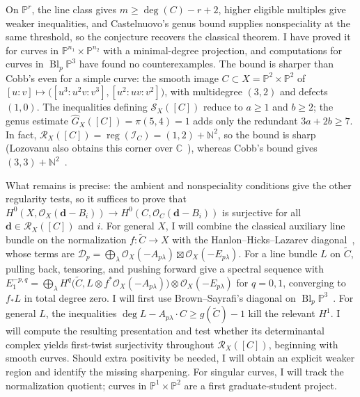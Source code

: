 \documentclass[11pt,reqno]{amsart}
\theoremstyle{remark}
\newcommand{\reg}{\operatorname{reg}}
\newcommand{\Bl}{\operatorname{Bl}}
\newcommand{\dd}{\mathbf{d}}
\newcommand{\CC}{\mathbb{C}}
\newcommand{\NN}{\mathbb{N}}
\newcommand{\PP}{\mathbb{P}}
\newcommand{\cD}{\mathcal{D}}
\newcommand{\cI}{\mathcal{I}}
\newcommand{\cO}{\mathcal{O}}
\newcommand{\cR}{\mathcal{R}}
\newcommand{\cS}{\mathcal{S}}
\begin{document}
On $\PP^r$, the line class gives $m\geq\deg(C)-r+2$, higher eligible multiples give weaker inequalities, and Castelnuovo's genus bound supplies nonspeciality at the same threshold, so the conjecture recovers the classical theorem. I have proved it for curves in $\PP^{n_1}\times\PP^{n_2}$ with a minimal-degree projection, and computations for curves in $\Bl_p\PP^3$ have found no counterexamples. The bound is sharper than Cobb's even for a simple curve: the smooth image $C\subset X=\PP^2\times\PP^2$ of $[u:v]\mapsto\bigl([u^3:u^2v:v^3],[u^2:uv:v^2]\bigr)$, with multidegree $(3,2)$ and defects $(1,0)$. The inequalities defining $\cS_X([C])$ reduce to $a\geq1$ and $b\geq2$; the genus estimate $\widehat G_X([C])=\pi(5,4)=1$ adds only the redundant $3a+2b\geq7$. In fact, $\cR_X([C])=\reg(\cI_C)=(1,2)+\NN^2$, so the bound is sharp (Lozovanu also obtains this corner over $\CC$~\cite[Thm.~A]{lozovanu09}), whereas Cobb's bound gives $(3,3)+\NN^2$~\cite[Prop.~B]{cobb24}.
 
 What remains is precise: the ambient and nonspeciality conditions give the other regularity tests, so it suffices to prove that $H^0(X,\cO_X(\dd-B_i))\to H^0(C,\cO_C(\dd-B_i))$ is surjective for all $\dd\in\cR_X([C])$ and $i$. For general $X$, I will combine the classical auxiliary line bundle on the normalization $f\colon\widetilde C\to X$ with the Hanlon--Hicks--Lazarev diagonal~\cite{GLP83,cobb24,HHL24}, whose terms are $\cD_p=\bigoplus_\lambda\cO_X(-A_{p\lambda})\boxtimes\cO_X(-E_{p\lambda})$. For a line
bundle $L$ on $\widetilde C$, pulling back, tensoring, and
pushing forward give a spectral sequence with
$E_1^{-p,q}=\bigoplus_\lambda
H^q\!\bigl(\widetilde C,L\otimes f^*\cO_X(-A_{p\lambda})\bigr)
\otimes\cO_X(-E_{p\lambda})$ for $q=0,1$,
converging to $f_*L$ in total degree zero. I will first use Brown--Sayrafi's diagonal on $\Bl_p\PP^3$~\cite{brownSayrafi24}. For general $L$, the inequalities $\deg L-A_{p\lambda}\cdot C\ge g(\widetilde C)-1$ kill the relevant $H^1$. I will compute the resulting presentation and test whether its determinantal complex yields first-twist surjectivity throughout $\cR_X([C])$, beginning with smooth curves. Should extra positivity be needed, I will obtain an explicit weaker region and identify the missing sharpening. For singular curves, I will track the normalization quotient; curves in $\PP^1\times\PP^2$ are a first graduate-student project.
\end{document}
